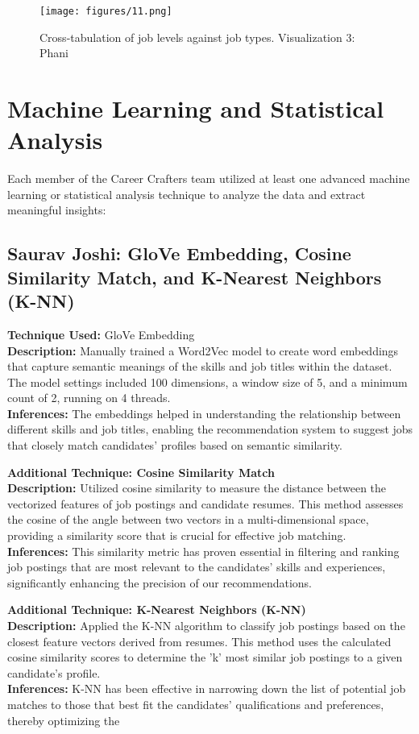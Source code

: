 \documentclass[a4paper,10pt]{article}
\begin{document}
    \begin{figure}[ht]
    \centering
    \texttt{[image: figures/11.png]}
    \caption{Cross-tabulation of job levels against job types. Visualization 3: Phani}
    \label{fig_cross_tab}
    \end{figure}



\section{Machine Learning and Statistical Analysis}

Each member of the Career Crafters team utilized at least one advanced machine learning or statistical analysis technique to analyze the data and extract meaningful insights:

\subsection{Saurav Joshi: GloVe Embedding, Cosine Similarity Match, and K-Nearest Neighbors (K-NN)}
\textbf{Technique Used:} GloVe Embedding\\
\textbf{Description:} Manually trained a Word2Vec model to create word embeddings that capture semantic meanings of the skills and job titles within the dataset. The model settings included 100 dimensions, a window size of 5, and a minimum count of 2, running on 4 threads.\\
\textbf{Inferences:} The embeddings helped in understanding the relationship between different skills and job titles, enabling the recommendation system to suggest jobs that closely match candidates' profiles based on semantic similarity.

\textbf{Additional Technique: Cosine Similarity Match}\\
\textbf{Description:} Utilized cosine similarity to measure the distance between the vectorized features of job postings and candidate resumes. This method assesses the cosine of the angle between two vectors in a multi-dimensional space, providing a similarity score that is crucial for effective job matching.\\
\textbf{Inferences:} This similarity metric has proven essential in filtering and ranking job postings that are most relevant to the candidates' skills and experiences, significantly enhancing the precision of our recommendations.

\textbf{Additional Technique: K-Nearest Neighbors (K-NN)}\\
\textbf{Description:} Applied the K-NN algorithm to classify job postings based on the closest feature vectors derived from resumes. This method uses the calculated cosine similarity scores to determine the 'k' most similar job postings to a given candidate's profile.\\
\textbf{Inferences:} K-NN has been effective in narrowing down the list of potential job matches to those that best fit the candidates' qualifications and preferences, thereby optimizing the
\end{document}

